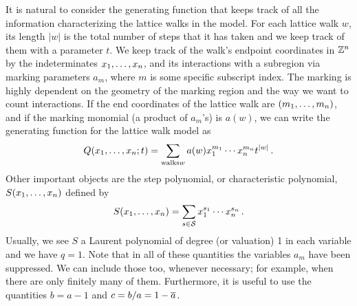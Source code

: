 It is natural to consider the generating function that keeps track of all the information characterizing the lattice walks in the model. For each lattice walk $w$, its length $|w|$ is the total number of steps that it has taken and we keep track of them with a parameter $t$. We keep track of the walk's endpoint coordinates in $\mathbb{Z}^n$ by the indeterminates $x_1,\ldots, x_n$, and its interactions with a subregion via marking parameters $a_m$, where $m$ is some specific subscript index. The marking is highly dependent on the geometry of the marking region and the way we want to count interactions. If the end coordinates of the lattice walk are $(m_1,\ldots, m_n)$, and if the marking monomial (a product of $a_m$'s) is $a(w)$, we can write the generating  function for the lattice walk model as
\begin{align}
	Q(x_1,\ldots, x_n;t) = \sum_{\text{walks} w} a(w) x_1^{m_1}\cdots x_n^{m_n} t^{|w|}\,.
\end{align}
Other important objects are the step polynomial, or characteristic polynomial, $S(x_1,\ldots, x_n)$ defined by
\begin{align}
	S(x_1,\ldots, x_n) = \sum_{s \in \mathcal{S}} x_1^{s_1}\cdots x_n^{s_n}\,.
\end{align}
Usually, we see $S$ a Laurent polynomial of degree (or valuation) 1 in each variable and we have $q = 1$. Note that in all of these quantities the variables $a_m$ have been suppressed. We can include those too, whenever necessary; for example, when there are only finitely many of them. Furthermore, it is useful to use the quantities $b = a - 1$ and $c = b/a = 1- \overline{a}$.
